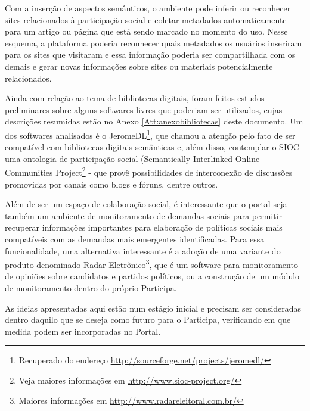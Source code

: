 Com a inserção de aspectos semânticos, o ambiente pode inferir ou reconhecer sites relacionados à participação social e coletar metadados automaticamente para um artigo ou página que está sendo marcado no momento do uso. Nesse esquema, a plataforma poderia reconhecer quais metadados os usuários inseriram para os sites que visitaram e essa informação poderia ser compartilhada com os demais e gerar novas informações sobre sites ou materiais potencialmente relacionados.

Ainda com relação ao tema de bibliotecas digitais, foram feitos estudos preliminares sobre alguns softwares livres que poderiam ser utilizados, cujas descrições resumidas estão no Anexo \ref{Att:anexobibliotecas} deste documento. Um dos softwares analisados é o JeromeDL\footnote{Recuperado do endereço \url{http://sourceforge.net/projects/jeromedl/}}, que chamou a atenção pelo fato de ser compatível com bibliotecas digitais semânticas e, além disso, contemplar o SIOC - uma ontologia de participação social (Semantically-Interlinked Online Communities Project\footnote{Veja maiores informações em \url{http://www.sioc-project.org/}} - que provê possibilidades de interconexão de discussões promovidas por canais como blogs e fóruns, dentre outros.

Além de ser um espaço de colaboração social, é interessante que o portal seja também um ambiente de monitoramento de demandas sociais para permitir recuperar informações importantes para elaboração de políticas sociais mais compatíveis com as demandas mais emergentes identificadas. Para essa funcionalidade, uma alternativa interessante é a adoção de uma variante do produto denominado Radar Eletrônico\footnote{Maiores informações em \url{http://www.radareleitoral.com.br/}}, que é um software para monitoramento de opiniões sobre candidatos e partidos políticos, ou a construção de um módulo de monitoramento dentro do próprio Participa.

As ideias apresentadas aqui estão num estágio inicial e precisam ser consideradas dentro daquilo que se deseja como futuro para o Participa, verificando em que medida podem ser incorporadas no Portal.
